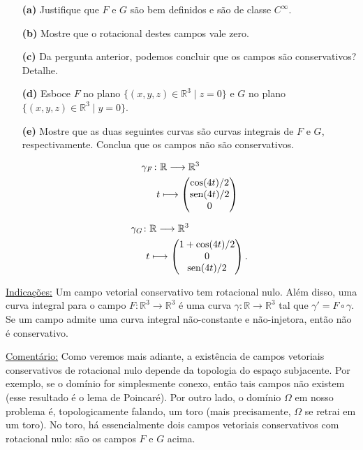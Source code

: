 \documentclass[11pt]{article}
\newcommand{\R}{\mathbb R}
\providecommand{\sin}{}\renewcommand{\sin}{\mathop{\rm sen}\nolimits}
\begin{document}
\begin{enumerate}
\item[\textbf{(a)}] Justifique que $F$ e $G$ são bem definidos e são de classe $C^\infty$.
\item[\textbf{(b)}] Mostre que o rotacional destes campos vale zero. 
\item[\textbf{(c)}] Da pergunta anterior, podemos concluir que os campos são conservativos? Detalhe.
\item[\textbf{(d)}] Esboce $F$ no plano $\{(x,y,z)\in\R^3\mid z=0\}$ e $G$ no plano $\{(x,y,z)\in\R^3\mid y=0\}$.
\item[\textbf{(e)}] Mostre que as duas seguintes curvas são curvas integrais de $F$ e $G$, respectivamente. Conclua que os campos não são conservativos.
\vspace{-0.5cm}
\begin{center}
\begin{minipage}{0.49\linewidth}
\begin{align*}
\gamma_F\colon&\R\longrightarrow\R^3\\
t&\longmapsto \begin{pmatrix}
\cos(4t)/2\\ \sin(4t)/2 \\ 0
\end{pmatrix}
\end{align*}
\end{minipage}
\begin{minipage}{0.49\linewidth}
\begin{align*}
\gamma_G\colon&\R\longrightarrow\R^3\\
t&\longmapsto \begin{pmatrix}
1+\cos(4t)/2\\ 0\\ \sin(4t)/2
\end{pmatrix}.
\end{align*}
\end{minipage}
\end{center}
\end{enumerate}

\noindent\underline{Indicações:} Um campo vetorial conservativo tem rotacional nulo. Além disso, uma curva integral para o campo $F\colon\R^3\rightarrow\R^3$ é uma curva $\gamma\colon\R\rightarrow\R^3$ tal que $\gamma' = F\circ \gamma$.
Se um campo admite uma curva integral não-constante e não-injetora, então não é conservativo.
\vspace{.10cm}

\noindent\underline{Comentário:} 
Como veremos mais adiante, a existência de campos vetoriais conservativos de rotacional nulo depende da topologia do espaço subjacente. 
Por exemplo, se o domínio for simplesmente conexo, então tais campos não existem (esse resultado é o lema de Poincaré). 
Por outro lado, o domínio $\Omega$ em nosso problema é, topologicamente falando, um toro (mais precisamente, $\Omega$ se retrai em um toro). 
No toro, há essencialmente dois campos vetoriais conservativos com rotacional nulo: são os campos $F$ e $G$ acima.
\vspace{1cm}
\end{document}
